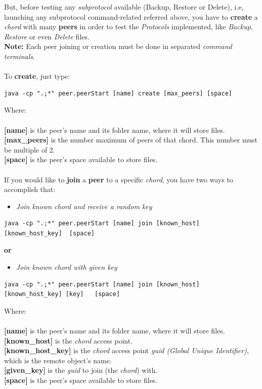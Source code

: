 \documentclass[11pt]{article}
\begin{document}
But, before testing any \textit{subprotocol} available (Backup, Restore or Delete), i.e, launching any subprotocol command-related referred above, you have to \textbf{create} a \textit{chord} with many \textbf{peers} in order to test the \textit{Protocols} implemented, like \textit{Backup}, \textit{Restore} or even \textit{Delete} files. 
\\
\textbf{Note:} Each peer joining or creation must be done in separated \textit{command terminals}.\\
\\
To \textbf{create}, just type:
\begin{lstlisting}
java -cp ".;*" peer.peerStart [name] create [max_peers] [space]
\end{lstlisting}
Where:\\
\\
\textbf{[name]} is the peer's name and its folder name, where it will store files.\\
\textbf{[max\_peers]} is the number maximum of peers of that chord. This number must be multiple of 2.\\
\textbf{[space]} is the peer's space available to store files.\\
\\
If you would like to \textbf{join} a \textbf{peer} to a specific \textit{chord}, you have two ways to accomplish that:\\
\begin{itemize}
\item \textit{Join known chord and receive a random key}
\end{itemize}
\begin{lstlisting}
java -cp ".;*" peer.peerStart [name] join [known_host] [known_host_key]	 [space]
\end{lstlisting}
\textbf{or}
\begin{itemize}
\item \textit{Join known chord with given key}
\end{itemize}
\begin{lstlisting}
java -cp ".;*" peer.peerStart [name] join [known_host] [known_host_key]	[key]   [space]
\end{lstlisting}
Where:\\
\\
\textbf{[name]} is the peer's name and its folder name, where it will store files.\\
\textbf{[known\_host]} is the \textit{chord} access point.\\
\textbf{[known\_host\_key]} is the \textit{chord} access point \textit{guid (Global Unique Identifier)}, which is the remote object's name.\\
\textbf{[given\_key]} is the \textit{guid} to  join (the \textit{chord}) with.\\
\textbf{[space]} is the peer's space available to store files.\\
\\
\end{document}
